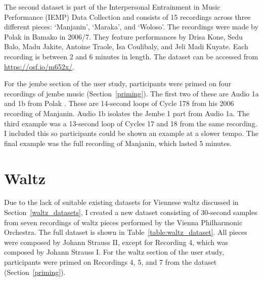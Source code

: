 \documentclass[12pt,twoside,openright]{report}
\begin{document}
The second dataset is part of the Interpersonal Entrainment in Music Performance (IEMP)
Data Collection \cite{polak2020,clayton2021} and consists of 15 recordings across three different pieces: `Manjanin', `Maraka', and `Woloso'. The recordings were made by Polak in Bamako in 2006/7. They feature performances by Drisa Kone, Sedu Balo, Madu Jakite, Antoine Traole, Isa Coulibaly, and Jeli Madi Kuyate. Each recording is between 2 and 6 minutes in length. The dataset can be accessed from \url{https://osf.io/m652x/}.

For the jembe section of the user study, participants were primed on four recordings of jembe music (Section~\ref{priming}). The first two of these are Audio 1a and 1b from Polak \cite{polak2010}. These are 14-second loops of Cycle 178 from his 2006 recording of Manjanin. Audio 1b isolates the Jembe 1 part from Audio 1a. The third example was a 13-second loop of Cycles 17 and 18 from the same recording. I included this so participants could be shown an example at a slower tempo. The final example was the full recording of Manjanin, which lasted 5 minutes.
\newpage



\section*{Waltz} \label{appendix_datasets_waltz}

Due to the lack of suitable existing datasets for Viennese waltz discussed in Section~\ref{waltz_datasets}, I created a new dataset consisting of 30-second samples from seven recordings of waltz pieces performed by the Vienna Philharmonic Orchestra. The full dataset is shown in Table~\ref{table:waltz_dataset}. All pieces were composed by Johann Strauss II, except for Recording 4, which was composed by Johann Strauss I. For the waltz section of the user study, participants were primed on Recordings 4, 5, and 7 from the dataset (Section~\ref{priming}). 
\end{document}
